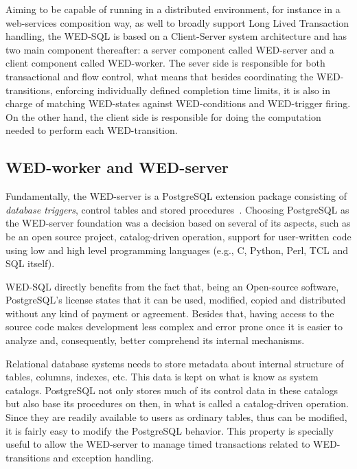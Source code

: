 \documentclass[conference]{IEEEtran}
\begin{document}
\par
Aiming to be capable of running in a distributed environment, for instance in a web-services composition way, as well
to broadly support Long Lived Transaction handling, the WED-SQL is based on a Client-Server system architecture and has
two main component thereafter: a server component called WED-server and a client component called WED-worker. The
sever side is responsible for both transactional and flow control, what means that besides coordinating the WED-transitions, 
enforcing individually defined completion time limits, it is also in charge of matching WED-states against WED-conditions 
and WED-trigger firing. On the other hand, the client side is responsible for doing the computation needed to perform each
WED-transition. 

\subsection{WED-worker and WED-server}
Fundamentally, the WED-server is a PostgreSQL extension package consisting of \emph{database triggers}, control tables and 
stored procedures~\cite{NAV}. Choosing PostgreSQL as the WED-server foundation was a decision based on several of its
aspects, such as be an open source project, catalog-driven operation, support for user-written code using low and high level 
programming languages (e.g., C, Python, Perl, TCL and SQL itself).

\par  WED-SQL directly benefits from the fact that, being an Open-source software, PostgreSQL's license states that it can be used, 
modified, copied and distributed without any kind of payment or agreement. Besides that, having access to the source code
makes development less complex and error prone once it is easier to analyze and, consequently, better comprehend its internal
mechanisms. 

\par Relational database systems needs to store metadata about internal structure of tables, columns, indexes, etc. This data
is kept on what is know as system catalogs. PostgreSQL not only stores much of its control data in these catalogs
but also base its procedures on then, in what is called a catalog-driven operation. Since they are readily  
available to users as ordinary tables, thus can be modified, it is fairly easy to modify the PostgreSQL behavior. This
property is specially useful to allow the WED-server to manage timed transactions related to WED-transitions and exception 
handling. 
\end{document}
